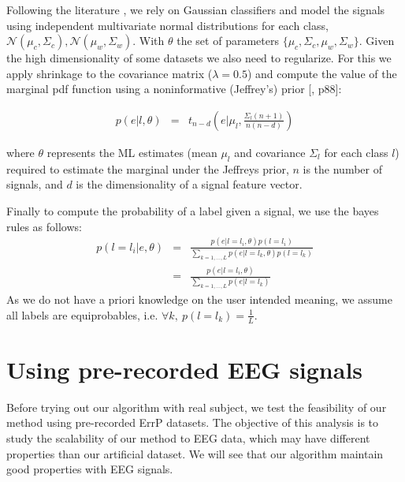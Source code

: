 Following the literature \cite{lotte2007review,blankertz2010single}, we rely on Gaussian classifiers and model the signals using independent multivariate normal distributions for each class, $\mathcal{N}(\mu_c, \Sigma_c), \mathcal{N}(\mu_w, \Sigma_w)$. With $\theta$ the set of parameters $\{\mu_c, \Sigma_c,\mu_w, \Sigma_w\}$. Given the high dimensionality of some datasets we also need to regularize. For this we apply shrinkage to the covariance matrix ($\lambda = 0.5$) and compute the value of the marginal pdf function using a noninformative (Jeffrey's) prior [\cite{gelman2003bayesian}, p88]:

\begin{eqnarray}
p(e|l, \theta) & = & t_{n-d}(e | \mu_l,\frac{\Sigma_l (n+1)}{n(n-d)})
\label{eq:prior}
\end{eqnarray}

where $\theta$ represents the ML estimates (mean $\mu_l$ and covariance $\Sigma_l$ for each class $l$) required to estimate the marginal under the Jeffreys prior, $n$ is the number of signals, and $d$ is the dimensionality of a signal feature vector.

Finally to compute the probability of a label given a signal, we use the bayes rules as follows: 
%
\begin{eqnarray}
    p(l = l_i|e,\theta) &=& \frac{p(e|l = l_i, \theta)p(l = l_i)}{\sum_{k = 1,\ldots, L}{p(e|l = l_k,\theta)p(l = l_k)}}\nonumber \\
    &=& \frac{p(e|l=l_i, \theta)}{\sum_{k = 1,\ldots, L} p(e|l=l_k)} \nonumber
\end{eqnarray}
%
As we do not have a priori knowledge on the user intended meaning, we assume all labels are equiprobables, i.e. $\forall k,~p(l = l_k) = \frac{1}{L}$.

\section{Using pre-recorded EEG signals}
\label{chapter:bci:EEGsignals}

Before trying out our algorithm with real subject, we test the feasibility of our method using pre-recorded ErrP datasets. The objective of this analysis is to study the scalability of our method to EEG data, which may have different properties than our artificial dataset. We will see that our algorithm maintain good properties with EEG signals.

